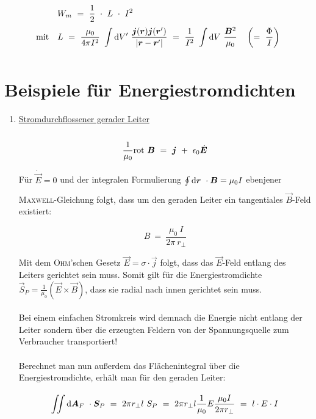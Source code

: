 \begin{align*}
& \ W_m  \ = \ \frac{1}{2} \ \cdot  \ L \ \cdot \ I^2 \\
\text{mit } \ & \ L \ = \ \frac{\mu_0}{4\pi I^2}\ \Int{}{}{V'} \frac{\vec{j}(\vec{r})\vec{j}(\vec{r}')}{|\vec{r}-\vec{r}'|} \ = \ \frac{1}{I^2} \ \Int{}{}{V} \frac{\vec{B}^2}{\mu_0} \quad
 \left( = \ \frac{\Phi}{I}\right) 
\end{align*}

\section{Beispiele für Energiestromdichten}

\begin{enumerate}[label=\roman*]
\item \underline{Stromdurchflossener gerader Leiter}\\
\ \\
\begin{equation*}
\frac{1}{\mu_0} \text{rot } \bm{B} \ = \ \bm{j} \ + \ \epsilon_0 \dot{\bm{E}}
\end{equation*}

Für $\dot{\vec{E}}=0$ und der integralen Formulierung $\oint\limits_{{}}^{{}}\mathrm{d}{\bm{r}}\  \cdot \bm{B} = \mu_0 I$ ebenjener \textsc{Maxwell}-Gleichung folgt, dass um den geraden Leiter ein tangentiales $\vec{B}$-Feld existiert:

\begin{equation*}
B \ = \ \frac{\mu_0 \ I}{2\pi \ r_{\perp}}
\end{equation*}

Mit dem \textsc{Ohm}'schen Gesetz $\vec{E} = \sigma \cdot\vec{j}$ folgt, dass das $\vec{E}$-Feld entlang des Leiters gerichtet sein muss. Somit gilt für die Energiestromdichte $\vec{S}_P = \frac{1}{\mu_0} \left(\vec{E}\times\vec{B}\right)$, dass sie radial nach innen gerichtet sein muss.\\
\ \\
Bei einem einfachen Stromkreis wird demnach die Energie nicht entlang der Leiter sondern über die erzeugten Feldern von der Spannungsquelle zum Verbraucher transportiert!\\
\ \\
Berechnet man nun außerdem das Flächenintegral über die Energiestromdichte, erhält man für den geraden Leiter:

\begin{equation*}
\Iint{}{}{\vec{A}_F}\cdot\vec{S}_P \ = \ 2\pi r_{\perp} l \ S_P \ = \ 2\pi r_{\perp} l \frac{1}{\mu_0}E\frac{\mu_0 I}{2\pi r_{\perp}} \ = \ l \cdot E \cdot I
\end{equation*}


\end{enumerate}
